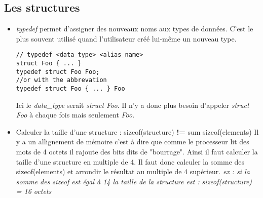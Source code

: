 \documentclass[12pt,a4paper]{article}
\begin{document}
\subsection{Les structures}
\begin{itemize}
\item \textit{typedef} permet d'assigner des nouveaux noms aux types de données. C'est le plus souvent utilisé quand l'utilisateur créé lui-même un nouveau type. 
\begin{lstlisting}
// typedef <data_type> <alias_name>
struct Foo { ... }
typedef struct Foo Foo;
//or with the abbrevation
typedef struct Foo { ... } Foo 
\end{lstlisting}
Ici le \textit{data\_type} serait \textit{struct Foo}. Il n'y a donc plus besoin d'appeler \textit{struct Foo} à chaque fois mais seulement \textit{Foo}.
\item Calculer la taille d'une structure : sizeof(structure) \textbf{!=} sum sizeof(elements)
\newline Il y a un allignement de mémoire c'est à dire que comme le processeur lit des mots de 4 octets il rajoute des bits dits de "bourrage". Ainsi il faut calculer la taille d'une structure en multiple de 4.
\newline Il faut donc calculer la somme des sizeof(elements) et arrondir le résultat au multiple de 4 supérieur. \textit{ex : si la somme des sizeof est égal à 14 la taille de la structure est : sizeof(structure) = 16 octets}
\end{itemize}
\end{document}
